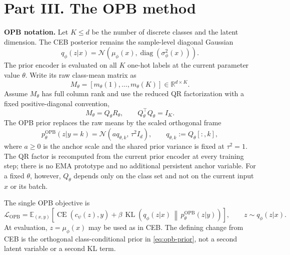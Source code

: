 \section*{Part III. The OPB method}

\textbf{OPB notation.}
Let $K \le d$ be the number of discrete classes and the latent dimension. The
CEB posterior remains the sample-level diagonal Gaussian
\begin{equation}
q_\phi(z|x) = \mathcal{N}\!\left(\mu_\phi(x),
\operatorname{diag}(\sigma^2_\phi(x))\right).
\label{eq:opb-posterior}
\end{equation}
The prior encoder is evaluated on all $K$ one-hot labels at the current parameter
value $\theta$. Write its raw class-mean matrix as
\begin{equation}
M_\theta = [m_\theta(1),\ldots,m_\theta(K)] \in \mathbb{R}^{d\times K}.
\label{eq:opb-raw-matrix}
\end{equation}
Assume $M_\theta$ has full column rank and use the reduced QR factorization with a
fixed positive-diagonal convention,
\begin{equation}
M_\theta = Q_\theta R_\theta,
\qquad Q_\theta^{\top}Q_\theta = I_K.
\label{eq:opb-qr}
\end{equation}
The OPB prior replaces the raw means by the scaled orthogonal frame
\begin{equation}
p_{\theta}^{\mathrm{OPB}}(z|y=k)
= \mathcal{N}\!\left(a q_{\theta,k},\,\tau^2 I_d\right),
\qquad q_{\theta,k}:=Q_\theta[:,k],
\label{eq:opb-prior}
\end{equation}
where $a \ge 0$ is the anchor scale and the shared prior variance is fixed at
$\tau^2=1$.
The QR factor is recomputed from the current prior encoder at every training step;
there is no EMA prototype and no additional persistent anchor variable. For a fixed
$\theta$, however, $Q_\theta$ depends only on the class set and not on the current
input $x$ or its batch.

The single OPB objective is
\begin{equation}
\mathcal{L}_{\mathrm{OPB}}
= \mathbb{E}_{(x,y)}\left[
\operatorname{CE}(c_\psi(z),y)
+ \beta\,\operatorname{KL}\!\left(q_\phi(z|x)\,
\middle\|\,p_{\theta}^{\mathrm{OPB}}(z|y)\right)
\right],
\qquad z\sim q_\phi(z|x).
\label{eq:opb-objective}
\end{equation}
At evaluation, $z=\mu_\phi(x)$ may be used as in CEB. The defining change from CEB
is the orthogonal class-conditional prior in \eqref{eq:opb-prior}, not a second
latent variable or a second KL term.

